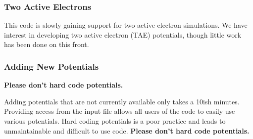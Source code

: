 \documentclass{article}
\begin{document}
\subsubsection{Two Active Electrons} %
\label{ssub:two_active_electrons}
This code is slowly gaining support for two active electron simulations. We have interest in developing two active electron (TAE) potentials, though little work has been done on this front.

\subsubsection{Adding New Potentials} %
\label{ssub:adding_new_potentials}
\textbf{Please don't hard code potentials.}

Adding potentials that are not currently available only takes a 10ish minutes. Providing access from the input file allows all users of the code to easily use various potentials. Hard coding potentials is a poor practice and leads to unmaintainable and difficult to use code. \textbf{Please don't hard code potentials.}
\end{document}
